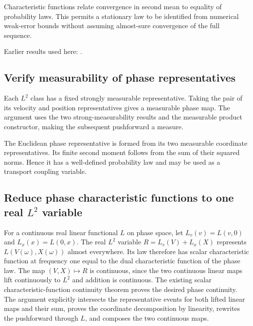 \documentclass[11pt,a4paper]{report}
\begin{document}
Characteristic functions relate convergence in second mean to equality of probability laws. This permits a stationary law to be identified from numerical weak-error bounds without assuming almost-sure convergence of the full sequence.



Earlier results used here: \cite[Section~3.5]{LangevinLean2026ULASC}.
\subsection{\texorpdfstring{Verify measurability of phase representatives}{Verify measurability of phase representatives}}
\label{report-step-KineticLangevin-LpPhaseLaw-lean-1}


Each \(L^{2}\) class has a fixed strongly measurable representative. Taking the pair of its velocity and position representatives gives a measurable phase map. The argument uses the two strong-measurability results and the measurable product constructor, making the subsequent pushforward a measure.



The Euclidean phase representative is formed from its two measurable coordinate representatives. Its finite second moment follows from the sum of their squared norms. Hence it has a well-defined probability law and may be used as a transport coupling variable.

\subsection{\texorpdfstring{Reduce phase characteristic functions to one real \(L^{2}\) variable}{Reduce phase characteristic functions to one real L² variable}}
\label{report-step-KineticLangevin-LpPhaseLaw-lean-2}


For a continuous real linear functional \(L\) on phase space, let \(L_v(v)=L(v,0)\) and \(L_x(x)=L(0,x)\). The real \(L^{2}\) variable \(R=L_v(V)+L_x(X)\) represents \(L(V(\omega),X(\omega))\) almost everywhere. Its law therefore has scalar characteristic function at frequency one equal to the dual characteristic function of the phase law. The map \((V,X)\mapsto R\) is continuous, since the two continuous linear maps lift continuously to \(L^{2}\) and addition is continuous. The existing scalar characteristic-function continuity theorem proves the desired phase continuity. The argument explicitly intersects the representative events for both lifted linear maps and their sum, proves the coordinate decomposition by linearity, rewrites the pushforward through \(L\), and composes the two continuous maps.
\end{document}

